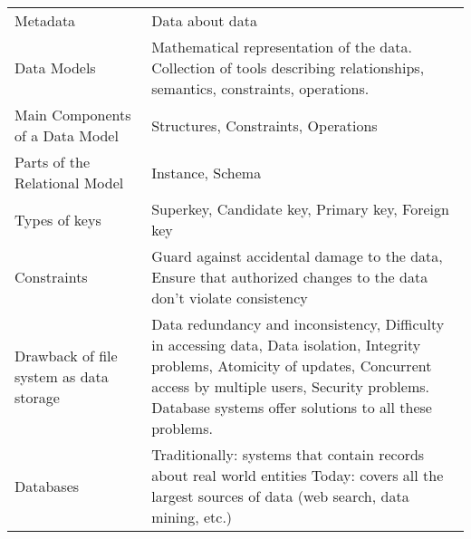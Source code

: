 \documentclass[a4paper,8pt,twocolumn]{extarticle}
\begin{document}
\begin{table}[h]
{\begin{tabular}{p{0.3\linewidth} | p{0.7\linewidth}}
Metadata                                & Data about data                                                                                                                                                                                                                                  \\
Data Models                             & Mathematical representation of the data. Collection of tools describing   relationships, semantics, constraints, operations.                                                                                                                     \\
Main Components of a Data Model         & Structures, Constraints, Operations                                                                                                                                                                                                              \\
Parts of the Relational Model           & Instance, Schema                                                                                                                                                                                                                                 \\
Types of keys                           & Superkey, Candidate key, Primary key, Foreign key                                                                                                                                                                                                \\
Constraints                             & Guard against accidental damage to the data, Ensure that authorized changes to the data don't violate consistency                                                                                                                                \\
Drawback of file system as data storage & Data redundancy and inconsistency, Difficulty in accessing data, Data   isolation, Integrity problems, Atomicity of updates, Concurrent access by   multiple users, Security problems. Database systems offer solutions to all   these problems. \\
Databases                               & Traditionally: systems that contain records about real world entities   Today: covers all the largest sources of data (web search, data mining, etc.)                                                                                            \\

\end{tabular}}
\end{table}
\end{document}

